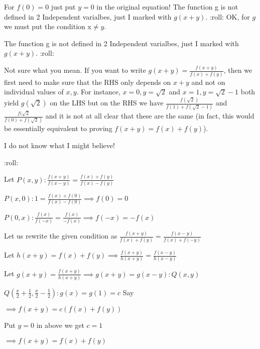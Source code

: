\begin{solution}
	For $f(0)=0$ just put $y=0$ in the original equation! The function g is not defined in 2 Independent varialbes, just I marked with $g(x+y)$. :roll: OK, for $g$ we must put the condition x$\neq y$.
\end{solution}



\begin{solution}
	\begin{tcolorbox}The function g is not defined in 2 Independent varialbes, just I marked with $g(x+y)$. :roll:\end{tcolorbox}
Not sure what you mean. If you want to write $g(x+y)=\frac{f(x+y)}{f(x)+f(y)}$, then we first need to make sure that the RHS only depends on $x+y$ and not on individual values of $x,y$.
For instance, $x=0, y=\sqrt{2}$ and $x=1, y=\sqrt{2}-1$ both yield $g(\sqrt{2})$ on the LHS but on the RHS we have $\frac{f(\sqrt{2})}{f(1)+f(\sqrt{2}-1)}$ and $\frac{f(\sqrt{2}}{f(0)+f(\sqrt{2})}$ and it is not at all clear that these are the same (in fact, this would be essentially equivalent to proving $f(x+y)=f(x)+f(y)$).


\end{solution}



\begin{solution}
	\begin{bolded}I do not know what I might believe!\end{bolded} :roll: 
\end{solution}



\begin{solution}
	Let $P(x,y): \frac{f(x+y)}{f(x-y)}=\frac{f(x)+f(y)}{f(x)-f(y)}$

$P(x,0): 1  =\frac{f(x)+f(0)}{f(x)-f(0)}\implies f(0)=0$

$P(0,x): \frac{f(x)}{f(-x)}=\frac{f(x)}{-f(x)}\implies f(-x)=-f(x)$ 

Let us rewrite the given condition as $\frac{f(x+y)}{f(x)+f(y)}=\frac{f(x-y)}{f(x)+f(-y)}$

Let $h(x+y)=f(x)+f(y)\implies \frac{f(x+y)}{h(x+y)}=\frac{f(x-y)}{h(x-y)}$

Let $g(x+y)=\frac{f(x+y)}{h(x+y)}\implies g(x+y)=g(x-y): Q(x,y)$ 

$Q\left(\frac x2+\frac 12,\frac x2 -\frac 12\right):g(x)=g(1)=c$ Say

$\implies f(x+y)=c\left(f(x)+f(y)\right)$

Put $y=0$ in above we get $c=1$

$\implies f(x+y)=f(x)+f(y)$
\end{solution}



